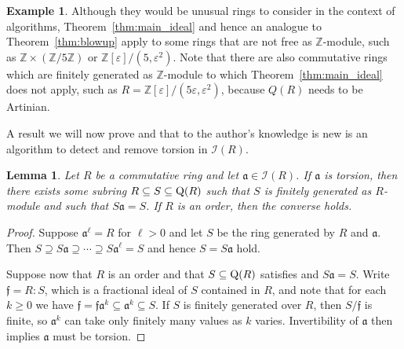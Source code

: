 \documentclass{amsart}
\theoremstyle{plain}
\newtheorem{lemma}[theorem]{Lemma}
\theoremstyle{definition}
\newtheorem{example}[theorem]{Example}
\newcommand{\Z}{\ensuremath{\mathbb{Z}}}
\begin{document}
\begin{example}
Although they would be unusual rings to consider in the context of algorithms, Theorem~\ref{thm:main_ideal} and hence an analogue to Theorem~\ref{thm:blowup} apply to some rings that are not free as $\Z$-module, such as $\Z\times(\Z/5\Z)$ or $\Z[\varepsilon]/(5,\varepsilon^2)$. Note that there are also commutative rings which are finitely generated as $\Z$-module to which Theorem~\ref{thm:main_ideal} does not apply, such as $R=\Z[\varepsilon]/(5\varepsilon,\varepsilon^2)$, because $Q(R)$ needs to be Artinian. 
\end{example}

A result we will now prove and that to the author's knowledge is new is an algorithm to detect and remove torsion in $\mathcal{I}(R)$.

\begin{lemma}\label{lem:torsion_equiv}
Let $R$ be a commutative ring and let $\mathfrak{a}\in\mathcal{I}(R)$.
If $\mathfrak{a}$ is torsion, then there exists some subring $R\subseteq S\subseteq\textup{Q}(R)$ such that $S$ is finitely generated as $R$-module and such that $S\mathfrak{a}=S$.
If $R$ is an order, then the converse holds.
\end{lemma}
\begin{proof}
Suppose $\mathfrak{a}^\ell=R$ for $\ell>0$ and let $S$ be the ring generated by $R$ and $\mathfrak{a}$.
Then $S\supseteq S\mathfrak{a} \supseteq \dotsm \supseteq S\mathfrak{a}^\ell = S$ and hence $S=S\mathfrak{a}$ hold. 

Suppose now that $R$ is an order and that $S\subseteq\textup{Q}(R)$ satisfies and $S\mathfrak{a}=S$. 
Write $\mathfrak{f}=R:S$, which is a fractional ideal of $S$ contained in $R$, and note that for each $k\geq0$ we have $\mathfrak{f}=\mathfrak{f}\mathfrak{a}^k\subseteq\mathfrak{a}^k\subseteq S$.
If $S$ is finitely generated over $R$, then $S/\mathfrak{f}$ is finite, so $\mathfrak{a}^k$ can take only finitely many values as $k$ varies. Invertibility of $\mathfrak{a}$ then implies $\mathfrak{a}$ must be torsion.
\end{proof}
\end{document}
